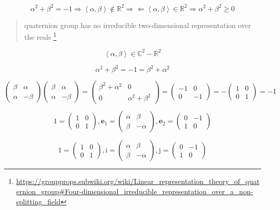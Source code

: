\documentclass[
]{book}
\theoremstyle{definition}
\theoremstyle{definition}
\theoremstyle{definition}
\theoremstyle{definition}
\theoremstyle{remark}
\begin{document}
\[
\alpha^{2}+\beta^{2}=-1\Rightarrow\left\langle \alpha,\beta\right\rangle \notin\mathbb{R}^{2}\Rightarrow\Leftarrow\left\langle \alpha,\beta\right\rangle \in\mathbb{R}^{2}\Rightarrow\alpha^{2}+\beta^{2}\ge0
\]

\begin{quote}
quaternion group has no irreducible two-dimensional representation over the reals \footnote{\url{https://groupprops.subwiki.org/wiki/Linear_representation_theory_of_quaternion_group\#Four-dimensional_irreducible_representation_over_a_non-splitting_field}}
\end{quote}

\[
\left\langle \alpha,\beta\right\rangle \in\mathbb{C}^{2}-\mathbb{R}^{2}
\]

\[
\alpha^{2}+\beta^{2}=-1=\beta^{2}+\alpha^{2}
\]

\[
\begin{pmatrix}\beta & \alpha\\
\alpha & -\beta
\end{pmatrix}\begin{pmatrix}\beta & \alpha\\
\alpha & -\beta
\end{pmatrix}=\begin{pmatrix}\beta^{2}+\alpha^{2} & 0\\
0 & \alpha^{2}+\beta^{2}
\end{pmatrix}=\begin{pmatrix}-1 & 0\\
0 & -1
\end{pmatrix}=-\begin{pmatrix}1 & 0\\
0 & 1
\end{pmatrix}=-1
\]

\[
1=\begin{pmatrix}1 & 0\\
0 & 1
\end{pmatrix},\boldsymbol{e}_{{\scriptscriptstyle 1}}=\begin{pmatrix}\alpha & \beta\\
\beta & -\alpha
\end{pmatrix},\boldsymbol{e}_{{\scriptscriptstyle 2}}=\begin{pmatrix}0 & -1\\
1 & 0
\end{pmatrix}
\]

\[
1=\begin{pmatrix}1 & 0\\
0 & 1
\end{pmatrix},\mathrm{i}=\begin{pmatrix}\alpha & \beta\\
\beta & -\alpha
\end{pmatrix},\mathrm{j}=\begin{pmatrix}0 & -1\\
1 & 0
\end{pmatrix}
\]
\end{document}
